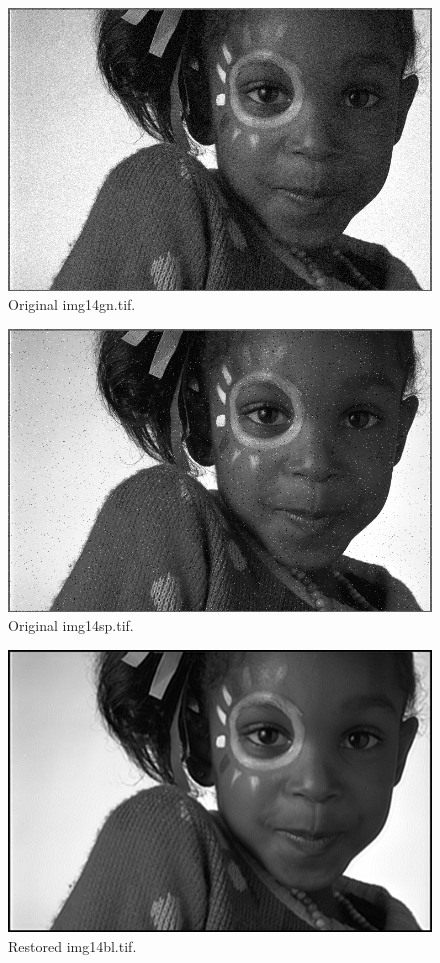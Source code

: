 \documentclass{article}
\begin{document}
\begin{figure}[H]
    \centering
    \includegraphics[width=1\textwidth]{../img14gn.png}
    \caption{Original img14gn.tif.}
\end{figure}
\begin{figure}[H]
    \centering
    \includegraphics[width=1\textwidth]{../img14sp.png}
    \caption{Original img14sp.tif.}
\end{figure}
\begin{figure}[H]
    \centering
    \includegraphics[width=1\textwidth]{../1-img14bl-restored.png}
    \caption{Restored img14bl.tif.}
\end{figure}
\end{document}
